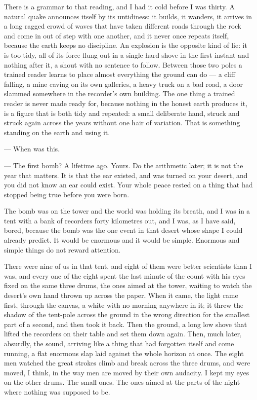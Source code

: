 There is a grammar to that reading, and I had it cold before I was thirty. A natural quake announces itself by its untidiness: it builds, it wanders, it arrives in a long ragged crowd of waves that have taken different roads through the rock and come in out of step with one another, and it never once repeats itself, because the earth keeps no discipline. An explosion is the opposite kind of lie: it is too tidy, all of its force flung out in a single hard shove in the first instant and nothing after it, a shout with no sentence to follow. Between those two poles a trained reader learns to place almost everything the ground can do --- a cliff falling, a mine caving on its own galleries, a heavy truck on a bad road, a door slammed somewhere in the recorder's own building. The one thing a trained reader is never made ready for, because nothing in the honest earth produces it, is a figure that is both tidy and repeated: a small deliberate hand, struck and struck again across the years without one hair of variation. That is something standing on the earth and using it.\par

\begin{room}

--- When was this.

--- The first bomb? A lifetime ago. Yours. Do the arithmetic later; it is not the year that matters. It is that the ear existed, and was turned on your desert, and you did not know an ear could exist. Your whole peace rested on a thing that had stopped being true before you were born.

\end{room}

The bomb was on the tower and the world was holding its breath, and I was in a tent with a bank of recorders forty kilometres out, and I was, as I have said, bored, because the bomb was the one event in that desert whose shape I could already predict. It would be enormous and it would be simple. Enormous and simple things do not reward attention.\par

There were nine of us in that tent, and eight of them were better scientists than I was, and every one of the eight spent the last minute of the count with his eyes fixed on the same three drums, the ones aimed at the tower, waiting to watch the desert's own hand thrown up across the paper. When it came, the light came first, through the canvas, a white with no morning anywhere in it; it threw the shadow of the tent-pole across the ground in the wrong direction for the smallest part of a second, and then took it back. Then the ground, a long low shove that lifted the recorders on their table and set them down again. Then, much later, absurdly, the sound, arriving like a thing that had forgotten itself and come running, a flat enormous slap laid against the whole horizon at once. The eight men watched the great strokes climb and break across the three drums, and were moved, I think, in the way men are moved by their own audacity. I kept my eyes on the other drums. The small ones. The ones aimed at the parts of the night where nothing was supposed to be.\par

